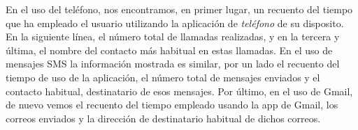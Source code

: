 \documentclass[12pt,a4paper,oneside]{book} %
\begin{document}
\newline \newline 
En el uso del teléfono, nos encontramos, en primer lugar, un recuento del tiempo que ha empleado el usuario utilizando la aplicación de \textit{teléfono} de su disposito. En la siguiente línea, el número total de llamadas realizadas, y en la tercera y última, el nombre del contacto más habitual en estas llamadas. 
\newline \newline 
En el uso de mensajes SMS la información mostrada es similar, por un lado el recuento del tiempo de uso de la aplicación, el número total de mensajes enviados y el contacto habitual, destinatario de esos mensajes. 
\newline \newline 
Por último, en el uso de Gmail, de nuevo vemos el recuento del tiempo empleado usando la app de Gmail, los correos enviados y la dirección de destinatario habitual de dichos correos. 
\end{document}
